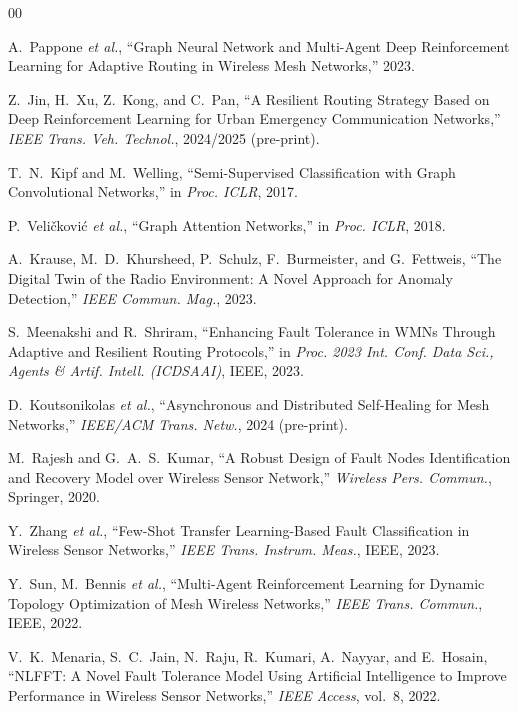 \documentclass[conference]{IEEEtran}
\begin{document}
\begin{thebibliography}{00}

A.~Pappone \textit{et al.}, ``Graph Neural Network and Multi-Agent Deep Reinforcement Learning for Adaptive Routing in Wireless Mesh Networks,'' 2023.

Z.~Jin, H.~Xu, Z.~Kong, and C.~Pan, ``A Resilient Routing Strategy Based on Deep Reinforcement Learning for Urban Emergency Communication Networks,'' \textit{IEEE Trans. Veh. Technol.}, 2024/2025 (pre-print).

T.~N.~Kipf and M.~Welling, ``Semi-Supervised Classification with Graph Convolutional Networks,'' in \textit{Proc. ICLR}, 2017.

P.~Veli\v{c}kovi\'{c} \textit{et al.}, ``Graph Attention Networks,'' in \textit{Proc. ICLR}, 2018.

A.~Krause, M.~D.~Khursheed, P.~Schulz, F.~Burmeister, and G.~Fettweis, ``The Digital Twin of the Radio Environment: A Novel Approach for Anomaly Detection,'' \textit{IEEE Commun. Mag.}, 2023.

S.~Meenakshi and R.~Shriram, ``Enhancing Fault Tolerance in WMNs Through Adaptive and Resilient Routing Protocols,'' in \textit{Proc. 2023 Int. Conf. Data Sci., Agents \& Artif. Intell. (ICDSAAI)}, IEEE, 2023.

D.~Koutsonikolas \textit{et al.}, ``Asynchronous and Distributed Self-Healing for Mesh Networks,'' \textit{IEEE/ACM Trans. Netw.}, 2024 (pre-print).

M.~Rajesh and G.~A.~S.~Kumar, ``A Robust Design of Fault Nodes Identification and Recovery Model over Wireless Sensor Network,'' \textit{Wireless Pers. Commun.}, Springer, 2020.

Y.~Zhang \textit{et al.}, ``Few-Shot Transfer Learning-Based Fault Classification in Wireless Sensor Networks,'' \textit{IEEE Trans. Instrum. Meas.}, IEEE, 2023.

Y.~Sun, M.~Bennis \textit{et al.}, ``Multi-Agent Reinforcement Learning for Dynamic Topology Optimization of Mesh Wireless Networks,'' \textit{IEEE Trans. Commun.}, IEEE, 2022.

V.~K.~Menaria, S.~C.~Jain, N.~Raju, R.~Kumari, A.~Nayyar, and E.~Hosain, ``NLFFT: A Novel Fault Tolerance Model Using Artificial Intelligence to Improve Performance in Wireless Sensor Networks,'' \textit{IEEE Access}, vol.~8, 2022.


\end{thebibliography}
\end{document}
